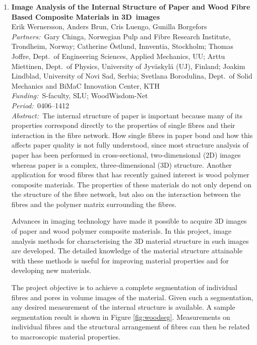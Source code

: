 \documentclass[10pt, a4paper]{article}
\newcommand{\aabstract}[1]{\emph{Abstract:~}#1}
\newcommand{\ffunding}[1]{\emph{Funding:~}#1\\}
\newcommand{\ppartners}[1]{\emph{Partners:~}#1\\}
\newcommand{\pperiod}[1]{\emph{Period:~}#1\\}
\begin{document}
{\begin{enumerate}
{		This year we presented a paper at SSBA that showed how to tune the parameters of the method that
		we published in the Journal of the Optical Society of America A (2013). Erik Wernersson defended his PhD thesis closely related to this project in December 2014.}
	
	
	
	\item 
	\label{proj:paper}
	\textbf{Image Analysis of the Internal Structure of Paper and Wood Fibre Based Composite Materials in 3D~images}\\%
	Erik Wernersson, Anders Brun, Cris Luengo, Gunilla Borgefors\\
	\ppartners{Gary Chinga, Norwegian Pulp and Fibre Research Institute, Trondheim, Norway;
		Catherine \"{O}stlund, Innventia, Stockholm; Thomas Joffre, Dept.~of Engineering Sciences, Applied
		Mechanics, UU; Arttu Miettinen, Dept.~of Physics, University of Jyv\"{a}skyl\"{a} (UJ), Finland;  Joakim Lindblad, University of Novi Sad, Serbia; Svetlana Borodulina, Dept.~of Solid Mechanics and BiMaC Innovation Center, KTH
	}
	\ffunding{S-faculty, SLU; WoodWisdom-Net}
	\pperiod{0406--1412}
	\aabstract{The internal structure of paper is important because many of its properties correspond
		directly to the properties of single fibres and their interaction in the fibre network. How single
		fibres in paper bond and how this affects paper quality is not fully understood, since most structure
		analysis of paper has been performed in cross-sectional, two-dimensional (2D) images whereas
		paper is a complex, three-dimensional (3D) structure.
		Another application for wood fibres that has recently gained interest is wood polymer
		composite materials. The properties of these materials do not only depend on the structure of the fibre
		network, but also on the interaction between the fibres and the polymer matrix surrounding the
		fibres.
		
		
		Advances in imaging technology have made it possible to acquire 3D images of paper and wood
		polymer composite materials. In this project, image analysis methods for characterising the 3D
		material structure in such images are developed. The detailed knowledge of the material structure
		attainable with these methods is useful for improving material properties and for developing new
		materials.
		
		The project objective is to achieve a complete segmentation of individual fibres and pores in
		volume images of the material. Given such a segmentation, any desired measurement of the internal
		structure is available. A sample segmentation result is shown in Figure \ref{fig:woodseg}. Measurements on individual fibres and the structural arrangement of fibres
		can then be related to macroscopic material properties.
		
}
\end{enumerate}}
\end{document}
